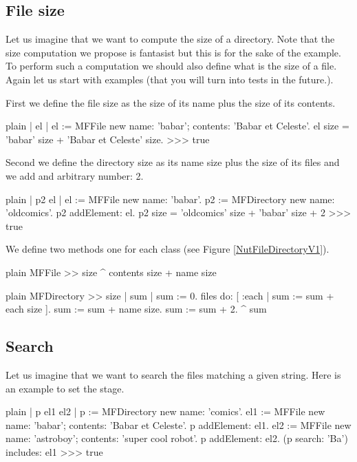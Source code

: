 \documentclass[10pt,twoside,english]{_support/latex/sbabook/sbabook}
\begin{document}
\subsection{File size }
Let us imagine that we want to compute the size of a directory. Note that the size computation we propose is fantasist but this is for the sake of the example. To perform such a computation we should also define what is the size of a file. Again let us start with examples (that you will turn into tests in the future.).

First we define the file size as the size of its name plus the size of its contents.

\begin{displaycode}{plain}
| el |
el := MFFile new name: 'babar'; contents: 'Babar et Celeste'.
el size = 'babar' size + 'Babar et Celeste' size.
>>> true
\end{displaycode}

Second we define the directory size as its name size plus the size of its files and we add and arbitrary number: 2. 

\begin{displaycode}{plain}
| p2 el |
el := MFFile new name: 'babar'.
p2 := MFDirectory new name: 'oldcomics'.
p2 addElement: el. 
p2 size = 'oldcomics' size + 'babar' size + 2
>>> true
\end{displaycode}

We define two methods  one for each class (see Figure \ref{NutFileDirectoryV1}).

\begin{displaycode}{plain}
MFFile >> size
	^ contents size + name size
\end{displaycode}

\begin{displaycode}{plain}
MFDirectory >> size
	| sum |
	sum := 0.
	files do: [ :each | sum := sum + each size ].
	sum := sum + name size.
	sum := sum + 2.
	^ sum
\end{displaycode}
\subsection{Search }
Let us imagine that we want to search the files matching a given string. 
Here is an example to set the stage.

\begin{displaycode}{plain}
| p el1 el2 |
p := MFDirectory new name: 'comics'.
el1 := MFFile new name: 'babar'; contents: 'Babar et Celeste'.
p addElement: el1.
el2 := MFFile new name: 'astroboy'; contents: 'super cool robot'.
p addElement: el2.
(p search: 'Ba') includes: el1
>>> true
\end{displaycode}
\end{document}
